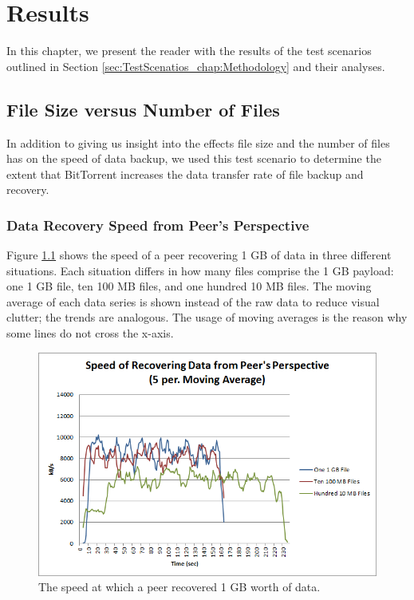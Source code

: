 \documentclass[12pt]{report}
\begin{document}

\chapter{Results} \label{chap:Results}

In this chapter, we present the reader with the results of the test scenarios outlined in Section \ref{sec:TestScenatios_chap:Methodology} and their analyses.

\section{File Size versus Number of Files} \label{sec:FileSizeversusNumberofFiles_chap:Results}

In addition to giving us insight into the effects file size and the number of files has on the speed of data backup, we used this test scenario to determine the extent that BitTorrent increases the data transfer rate of file backup and recovery.

\subsection{Data Recovery Speed from Peer's Perspective} \label{subsec:DataRecoverySpeedfromPeersPerspective}

Figure \ref{fig:PeerRecoverySpeed} shows the speed of a peer recovering 1 GB of data in three different situations. Each situation differs in how many files comprise the 1 GB payload: one 1 GB file, ten 100 MB files, and one hundred 10 MB files. The moving average of each data series is shown instead of the raw data to reduce visual clutter; the trends are analogous. The usage of moving averages is the reason why some lines do not cross the x-axis.

\begin{figure}
  \centerline{\includegraphics[scale=1]{figures/PeerRecoverySpeed}}
  \caption{The speed at which a peer recovered 1 GB worth of data. \label{fig:PeerRecoverySpeed}}
\end{figure}
\end{document}
